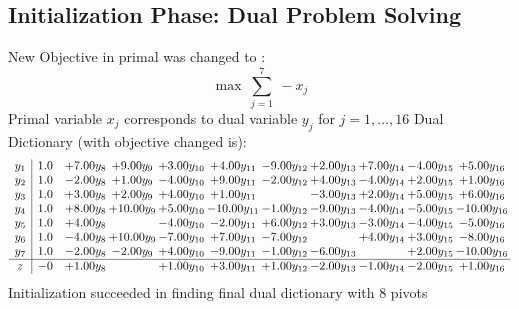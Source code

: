 \documentclass[9pt]{article}
\begin{document}
\subsection{Initialization Phase: Dual Problem Solving}
New Objective in primal was changed to : \[ \max\ \sum_{j=1}^{7}\ - x_j \] 
Primal variable $x_j$ corresponds to dual variable $y_j$ for $j = 1,\ldots,16$
Dual Dictionary (with objective changed is): 
\[\begin{array}{c| c c@{\hskip 2pt} c@{\hskip 2pt} c@{\hskip 2pt} c@{\hskip 2pt} c@{\hskip 2pt} c@{\hskip 2pt} c@{\hskip 2pt} c@{\hskip 2pt} c@{\hskip 2pt} }
 y_{1}   &  1.0 & +  7.00 y_{8} & +  9.00 y_{9} & +  3.00 y_{10} & +  4.00 y_{11} & -9.00 y_{12} & +  2.00 y_{13} & +  7.00 y_{14} & -4.00 y_{15} & +  5.00 y_{16}\\
 y_{2}   &  1.0 & -2.00 y_{8} & +  1.00 y_{9} & -4.00 y_{10} & +  9.00 y_{11} & -2.00 y_{12} & +  4.00 y_{13} & -4.00 y_{14} & +  2.00 y_{15} & +  1.00 y_{16}\\
 y_{3}   &  1.0 & +  3.00 y_{8} & +  2.00 y_{9} & +  4.00 y_{10} & +  1.00 y_{11} &   & -3.00 y_{13} & +  2.00 y_{14} & +  5.00 y_{15} & +  6.00 y_{16}\\
 y_{4}   &  1.0 & +  8.00 y_{8} & + 10.00 y_{9} & +  5.00 y_{10} & -10.00 y_{11} & -1.00 y_{12} & -9.00 y_{13} & -4.00 y_{14} & -5.00 y_{15} & -10.00 y_{16}\\
 y_{5}   &  1.0 & +  4.00 y_{8} &   & -4.00 y_{10} & -2.00 y_{11} & +  6.00 y_{12} & +  3.00 y_{13} & -3.00 y_{14} & -4.00 y_{15} & -5.00 y_{16}\\
 y_{6}   &  1.0 & -4.00 y_{8} & + 10.00 y_{9} & -7.00 y_{10} & +  7.00 y_{11} & -7.00 y_{12} &   & +  4.00 y_{14} & +  3.00 y_{15} & -8.00 y_{16}\\
 y_{7}   &  1.0 & -2.00 y_{8} & -2.00 y_{9} & +  4.00 y_{10} & -9.00 y_{11} & -1.00 y_{12} & -6.00 y_{13} &   & +  2.00 y_{15} & -10.00 y_{16}\\
\hline
z    &  -0 & +  1.00 y_{8} &   & +  1.00 y_{10} & +  3.00 y_{11} & +  1.00 y_{12} & -2.00 y_{13} & -1.00 y_{14} & -2.00 y_{15} & +  1.00 y_{16}\\
\end{array}\]
Initialization succeeded in finding final dual dictionary with 8 pivots
\end{document}

